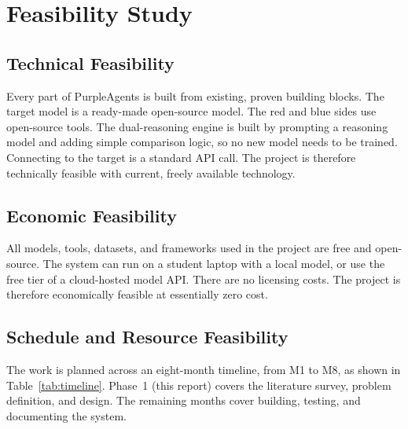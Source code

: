 \chapter{Feasibility Study}
\label{ch:feas}

\section{Technical Feasibility}

Every part of PurpleAgents is built from existing, proven building blocks. The
target model is a ready-made open-source model. The red and blue sides use
open-source tools. The dual-reasoning engine is built by prompting a reasoning
model and adding simple comparison logic, so no new model needs to be trained.
Connecting to the target is a standard API call. The project is therefore
technically feasible with current, freely available technology.

\section{Economic Feasibility}

All models, tools, datasets, and frameworks used in the project are free and
open-source. The system can run on a student laptop with a local model, or use
the free tier of a cloud-hosted model API. There are no licensing costs. The
project is therefore economically feasible at essentially zero cost.

\section{Schedule and Resource Feasibility}

The work is planned across an eight-month timeline, from M1 to M8, as shown in
Table~\ref{tab:timeline}. Phase~1 (this report) covers the literature survey,
problem definition, and design. The remaining months cover building, testing,
and documenting the system.

